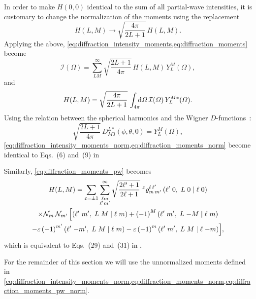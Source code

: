 In order to make $H(0, 0)$ identical to the sum of all partial-wave
intensities, it is customary to change the normalization of the
moments using the replacement
\begin{equation}
  H(L, M)
  \to \sqrt{\frac{4 \pi}{2 L + 1}}\, H(L, M).
\end{equation}
Applying the above,
\cref{eq:diffraction_intensity_moments,eq:diffraction_moments} become
\begin{equation}
  \label{eq:diffraction_intensity_moments_norm}
  \mathcal{I}(\Omega)
  = \sum_{L M}^\infty \sqrt{\frac{2 L + 1}{4 \pi}}\, H(L, M)\, Y_L^M(\Omega),
\end{equation}
and
\begin{equation}
  \label{eq:diffraction_moments_norm}
  H(L, M)
  = \sqrt{\frac{4 \pi}{2 L + 1}}\, \int_{4 \pi}\!\!\! \dif{\Omega}\, \mathcal{I}(\Omega)\, Y_L^{M *}(\Omega).
\end{equation}
Using the relation between the spherical harmonics and the Wigner
$D$-functions~\cite{wikipedia:wignerD}:
\begin{equation}
  \sqrt{\frac{2 L + 1}{4 \pi}}\, D^{L *}_{M 0}(\phi, \theta, 0)
  = Y_L^M(\Omega),
\end{equation}
\cref{eq:diffraction_intensity_moments_norm,eq:diffraction_moments_norm}
become identical to Eqs.~(6) and~(9) in 

Similarly, \cref{eq:diffraction_moments_pw} becomes
\begin{multline}
  \label{eq:diffraction_moments_pw_norm}
  H(L, M)
  = \sum_{\varepsilon = \pm 1} \sum_{\substack{\ell m \\ \ell' m'}}^\infty
    \sqrt{\frac{2 \ell' + 1}{2 \ell + 1}}\,
    \prescript{\ensuremath{\varepsilon}}{}{\varrho}^{\ell\, \ell'}_{m\, m'}\, ({\ell'}\;{0},\;{L}\;{0}\; |\; {\ell}\;{0}) \\
    \times \mathcal{N}_m\, \mathcal{N}_{m'}\, \Big[
      ({\ell'}\;{m'},\;{L}\;{M}\; |\; {\ell}\;{m})
      + {(-1)}^M\, ({\ell'}\;{m'},\;{L}\;{-M}\; |\; {\ell}\;{m}) \\
      - \varepsilon\, {(-1)}^{m'}\, ({\ell'}\;{-m'},\;{L}\;{M}\; |\; {\ell}\;{m})
      - \varepsilon\, {(-1)}^m\, ({\ell'}\;{m'},\;{L}\;{M}\; |\; {\ell}\;{-m}) \Big],
\end{multline}
which is equivalent to Eqs.~(29) and~(31) in .

For the remainder of this section we will use the unnormalized moments
defined in
\cref{eq:diffraction_intensity_moments_norm,eq:diffraction_moments_norm,eq:diffraction_moments_pw_norm}.


